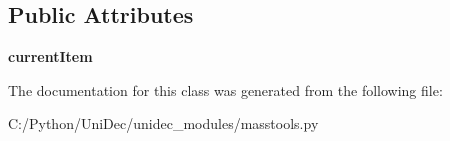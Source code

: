 \subsection*{Public Attributes}
\begin{DoxyCompactItemize}
\item 
\hypertarget{class_uni_dec_1_1unidec__modules_1_1masstools_1_1_test_list_ctrl_a2c145ba457fbc973a284e82086e72de6}{}{\bfseries current\+Item}\label{class_uni_dec_1_1unidec__modules_1_1masstools_1_1_test_list_ctrl_a2c145ba457fbc973a284e82086e72de6}

\end{DoxyCompactItemize}


The documentation for this class was generated from the following file\+:\begin{DoxyCompactItemize}
\item 
C\+:/\+Python/\+Uni\+Dec/unidec\+\_\+modules/masstools.\+py\end{DoxyCompactItemize}
